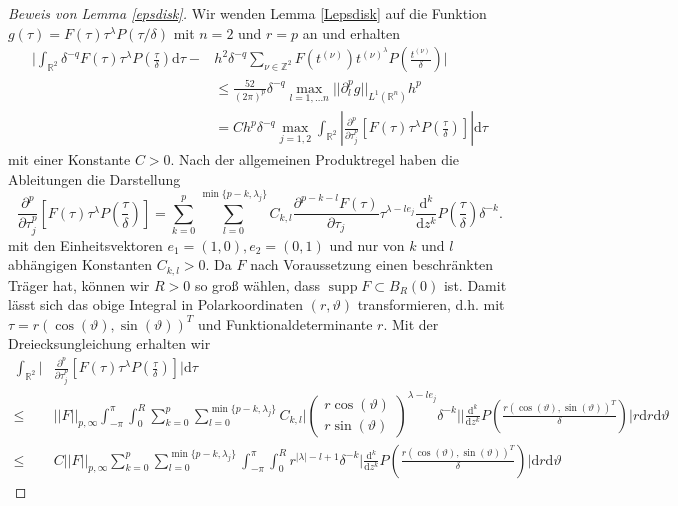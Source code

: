 \documentclass[12pt,a4paper]{scrartcl}
\newcommand{\dd}{\mathrm{d}}
\numberwithin{equation}{section}
\newcommand{\R}{\mathbb{R}} %
\newcommand{\Z}{\mathbb{Z}} %
\newcommand{\supp}{\operatorname{supp}}
\begin{document}
\begin{proof}[Beweis von Lemma \ref{epsdisk}]
Wir wenden Lemma \ref{Lepsdisk} auf die Funktion $g(\tau)=F(\tau) \tau^\lambda P(\tau/\delta)$ mit $n=2$ und $r=p$ an und erhalten
\begin{align*}
\bigg|\int_{\R^2} \delta^{-q}F(\tau)\tau^\lambda P\left(\frac{\tau}{\delta}\right) \dd \tau - &  h^2 \delta^{-q} \sum_{\nu \in \Z^2}F(t^{(\nu)})t^{(\nu)^\lambda} P\left(\frac{t^{(\nu)}}{\delta}\right)\bigg| \\ 
&\leq \frac{52}{(2\pi)^p}\delta ^{-q}\max_{l=1, \dots n}||\partial_l^p g ||_{L^1(\R^n)} h^p \\
&= C h^p \delta^{-q} \max_{j=1,2} \int_{\R^2} \left| \frac{\partial^p}{\partial \tau_j^p}\left[F(\tau) \tau^\lambda P\left(\frac{\tau}{\delta}\right) \right] \right| \dd \tau
\end{align*}
mit einer Konstante $C>0$. Nach der allgemeinen Produktregel haben die Ableitungen die Darstellung
\[
\frac{\partial^p}{\partial \tau_j^p}\left[F(\tau) \tau^\lambda P\left(\frac{\tau}{\delta}\right) \right] = \sum_{k=0}^p \sum_{l=0}^{\min\{p-k,\lambda_j\}} C_{k,l} \frac{\partial^{p-k-l}F(\tau)}{\partial \tau_j}\tau^{\lambda-l e_j} \frac{\dd^k}{\dd z^k}P\left(\frac{\tau}{\delta}\right) \delta^{-k}.
\]
mit den Einheitsvektoren $e_1=(1,0), e_2=(0,1)$ und nur von $k$ und $l$ abhängigen Konstanten $C_{k,l}>0$.
Da $F$ nach Voraussetzung einen beschränkten Träger hat, können wir $R>0$ so groß wählen, dass $\supp F \subset B_R (0)$ ist. Damit lässt sich das obige Integral in Polarkoordinaten $(r,\vartheta)$ transformieren, d.h. mit $\tau = r( \cos (\vartheta),\sin(\vartheta))^T$ und Funktionaldeterminante $r$. Mit der Dreiecksungleichung erhalten wir
\begin{align*}
 \int_{\R^2} \bigg| &\frac{\partial^p}{\partial \tau_j^p} \left[F(\tau) \tau^\lambda P\left(\frac{\tau}{\delta}\right) \right] \bigg| \dd \tau \\ 
  \leq & ||F||_{p,\infty} \int_{-\pi}^\pi \int_0^R   \sum_{k=0}^p \sum_{l=0}^{\min\{p-k,\lambda_j\}} C_{k,l} \bigg| \begin{pmatrix}
r\cos(\vartheta) \\ r\sin(\vartheta)
 \end{pmatrix}^{\lambda-l e_j}\delta^{-k}\bigg| \bigg|\frac{\dd^k}{\dd z^k}P\left(\frac{r( \cos (\vartheta),\sin(\vartheta))^T}{\delta}\right)\bigg|r \dd r \dd \vartheta \\
  \leq & C ||F||_{p,\infty} \sum_{k=0}^p \sum_{l=0}^{\min\{p-k,\lambda_j\}}
 \int_{-\pi}^\pi \int_0^R r
^{|\lambda|-l+1} \delta^{-k} \bigg|\frac{\dd^k}{\dd z^k}P\left(\frac{r( \cos (\vartheta),\sin(\vartheta))^T}{\delta}\right)\bigg| \dd r \dd \vartheta

\end{align*}
\end{proof}
\end{document}
